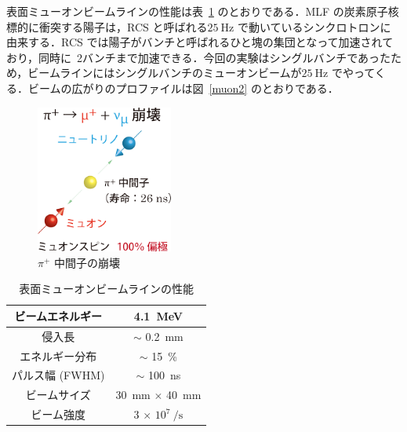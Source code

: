 表面ミューオンビームラインの性能は表~\ref{muon1} のとおりである．MLF の炭素原子核標的に衝突する陽子は，RCS と呼ばれる$25~\mathrm{Hz}$ で動いているシンクロトロンに由来する．RCS では陽子がバンチと呼ばれるひと塊の集団となって加速されており，同時に~2バンチまで加速できる．今回の実験はシングルバンチであったため，ビームラインにはシングルバンチのミューオンビームが$25~\mathrm{Hz}$ でやってくる．ビームの広がりのプロファイルは図~\ref{muon2} のとおりである．

\begin{figure}[H]
\centering
\includegraphics[width=0.4\textwidth]{figure/hayakawa/decay_pion.png}
\caption{$\pi^{+}$ 中間子の崩壊\cite{aboutmuon}}
\end{figure}

\begin{table}[H]
\caption{表面ミューオンビームラインの性能}
\label{muon1}
\centering
\begin{tabular}{cc}\toprule
ビームエネルギー & 4.1~MeV \\ \midrule
侵入長 & $\sim$ 0.2~mm \\ \midrule
エネルギー分布 & $\sim$ 15~\% \\ \midrule
パルス幅 (FWHM) & $\sim$ 100~ns \\ \midrule
ビームサイズ & 30~mm $\times$ 40~mm \\ \midrule
ビーム強度 & 3 $\times$ $10^7~/\mathrm{s}$ \\  \bottomrule
\end{tabular}
\end{table}
   
